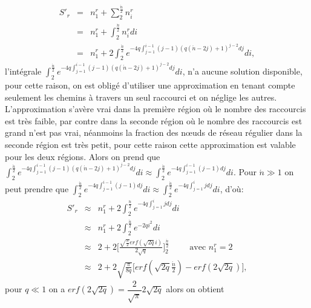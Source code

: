 \begin{eqnarray}
S'_r &=&n_{1}^{r}+\sum^{\frac{\acute{n}}{2}}_2n_{i}^{r}\\\nonumber
&=&n_{1}^{r}+\int^{\frac{\acute{n}}{2}}_2n_{i}^{r}di\\\nonumber
&=&n_{1}^{r}+2\int^{\frac{\acute{n}}{2}}_2e^{-4q\int_{j=1}^{i-1}(j-1)(q(\acute{n}-2j)+1)^{j-2}dj}di,\nonumber
\end{eqnarray}
l'intégrale $\int^{\frac{\acute{n}}{2}}_2e^{-4q\int_{j=1}^{i-1}(j-1)(q(\acute{n}-2j)+1)^{j-2}dj}di$, n'a aucune solution disponible, pour cette raison, on est obligé d'utiliser une approximation en tenant compte seulement les chemins à travers un seul raccourci et on néglige les autres.\\
L'approximation s'avère vrai dans la première région où le nombre des raccourcis est très faible, par contre dans
la seconde région où le nombre des raccourcis est grand n'est pas vrai, néanmoins la fraction des nœuds de réseau régulier dans la seconde région est très petit, pour cette raison cette approximation est valable pour les deux régions. Alors on prend que 
$\int^{\frac{\acute{n}}{2}}_2e^{-4q\int_{j=1}^{i-1}(j-1)(q(\acute{n}-2j)+1)^{j-2}dj}di\approx\int^{\frac{\acute{n}}{2}}_2e^{-4q\int_{j=1}^{i-1}(j-1)dj}di$.
Pour $\acute{n}\gg 1$ on peut prendre que $ \int^{\frac{\acute{n}}{2}}_2e^{-4q\int_{j=1}^{i-1}(j-1)dj}di\approx\int^{\frac{\acute{n}}{2}}_2e^{-4q\int_{j=1}^{i}jdj}di$,
d'où:
\begin{eqnarray}
\label{sr}
S'_r &\approx&n_{1}^{r}+2\int^{\frac{\acute{n}}{2}}_2e^{-4q\int_{j=1}^{i}jdj}di\\\nonumber
&\approx&n_{1}^{r}+2\int^{\frac{\acute{n}}{2}}_2e^{-2qi^2}di\\\nonumber
&\approx&2+2\Big[\frac{\sqrt{\frac{\pi}{2}}erf(\sqrt{2q}i)}{2\sqrt{q}}\Big]^{\frac{\acute{n}}{2}}_2 \hspace{1cm}
\textrm{avec }  n_{1}^{r}=2 \\\nonumber
&\approx&2+ 2\sqrt{\frac{\pi}{8q}}\Big[erf(\sqrt{2q}\frac{\acute{n}}{2})-erf(2\sqrt{2q})\Big], \nonumber
\end{eqnarray}
pour $q\ll 1$ on a $erf(2\sqrt{2q})=\dfrac{2}{\sqrt{\pi}}2\sqrt{2q}$ alors on obtient

